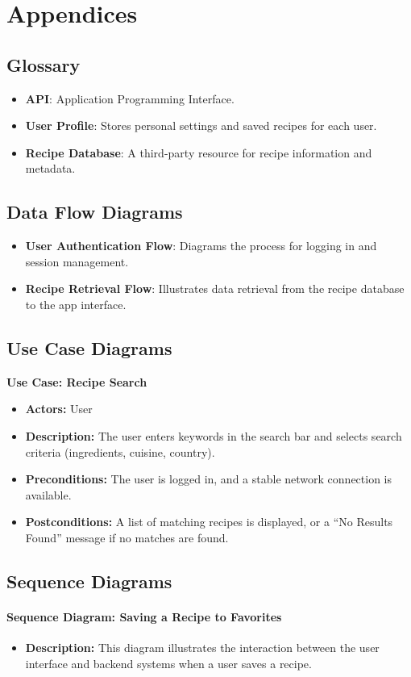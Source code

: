 \documentclass[12pt]{article}
\begin{document}
\newpage
\section{Appendices}

\subsection{Glossary}
\begin{itemize}
    \item \textbf{API}: Application Programming Interface.
    \item \textbf{User Profile}: Stores personal settings and saved recipes for each user.
    \item \textbf{Recipe Database}: A third-party resource for recipe information and metadata.
\end{itemize}

\subsection{Data Flow Diagrams}
\begin{itemize}
    \item \textbf{User Authentication Flow}: Diagrams the process for logging in and session management.
    \item \textbf{Recipe Retrieval Flow}: Illustrates data retrieval from the recipe database to the app interface.
\end{itemize}

\subsection{Use Case Diagrams}
\textbf{Use Case: Recipe Search}
\begin{itemize}
    \item \textbf{Actors:} User
    \item \textbf{Description:} The user enters keywords in the search bar and selects search criteria (ingredients, cuisine, country).
    \item \textbf{Preconditions:} The user is logged in, and a stable network connection is available.
    \item \textbf{Postconditions:} A list of matching recipes is displayed, or a “No Results Found” message if no matches are found.
\end{itemize}

\subsection{Sequence Diagrams}
\paragraph{Sequence Diagram: Saving a Recipe to Favorites}
\begin{itemize}
    \item \textbf{Description:} This diagram illustrates the interaction between the user interface and backend systems when a user saves a recipe.
\end{itemize}
\end{document}
